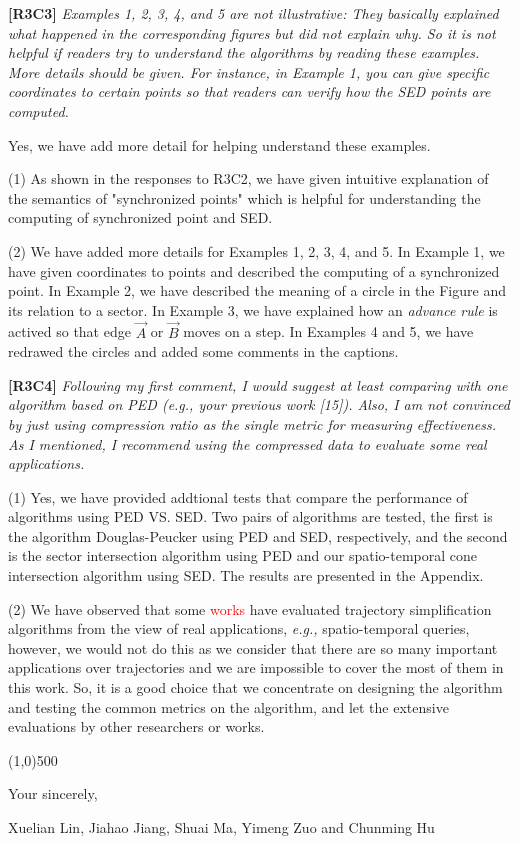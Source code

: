 \documentclass{letter}
\newcommand{\eg}{\emph{e.g.,}\xspace}
\begin{document}
\textbf{[R3C3]} \emph{Examples 1, 2, 3, 4, and 5 are not illustrative: They basically explained what happened in the corresponding figures but did not explain why. So it is not helpful if readers try to understand the algorithms by reading these examples. More details should be given. For instance, in Example 1, you can give specific coordinates to certain points so that readers can verify how the SED points are computed.}

Yes, we have add more detail for helping understand these examples. 

(1) As shown in the responses to R3C2, we have given intuitive explanation of the semantics of "synchronized points" which is helpful for understanding the computing of synchronized point and SED.

(2) We have added more details for Examples 1, 2, 3, 4, and 5. In Example 1, we have given coordinates to points and described the computing of a synchronized point. In Example 2, we have described the meaning of a circle in the Figure and its relation to a sector. In Example 3, we have explained how an \emph{advance rule} is actived so that edge $\overrightarrow{A}$ or $\overrightarrow{B}$ moves on a step. In Examples 4 and 5, we have redrawed the circles and added some comments in the captions.

\textbf{[R3C4]} \emph{Following my first comment, I would suggest at least comparing with one algorithm based on PED (e.g., your previous work [15]). Also, I am not convinced by just using compression ratio as the single metric for measuring effectiveness. As I mentioned, I recommend using the compressed data to evaluate some real applications.}

(1) Yes, we have provided addtional tests that compare the performance of algorithms using PED VS. SED. Two pairs of algorithms are tested, the first is the algorithm Douglas-Peucker using PED and SED, respectively, and the second is the sector intersection algorithm using PED and our spatio-temporal cone intersection algorithm using SED. %
The results are presented in the Appendix.

(2) We have observed that some \textcolor{red}{works} have evaluated trajectory simplification algorithms from the view of real applications, \eg spatio-temporal queries, however, we would not do this as we consider that there are so many important applications over trajectories and we are impossible to cover the most of them in this work. So, it is a good choice that we concentrate on designing the algorithm and testing the common metrics on the  algorithm, and let the extensive evaluations by other researchers or works.


\line(1,0){500}

Your sincerely,

Xuelian Lin, Jiahao Jiang, Shuai Ma, Yimeng Zuo and Chunming Hu
\end{document}
